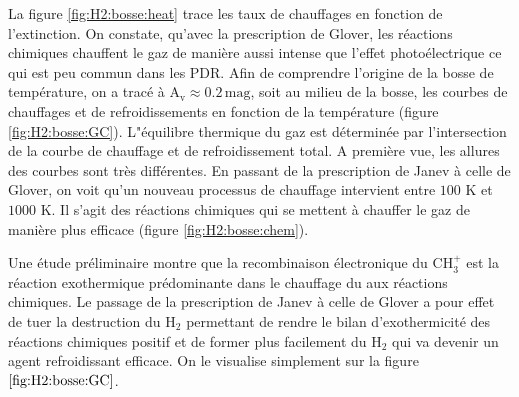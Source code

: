 La figure \ref{fig:H2:bosse:heat} trace les taux de chauffages en fonction de l'extinction. On constate, qu'avec la prescription de Glover, les réactions chimiques chauffent le gaz de manière aussi intense que l'effet photoélectrique ce qui est peu commun dans les PDR. Afin de comprendre l'origine de la bosse de température, on a tracé à $\mathrm{A}_\mathrm{v} \approx 0.2 \,\mathrm{mag}$, soit au milieu de la bosse, les courbes de chauffages et de refroidissements en fonction de la température (figure \ref{fig:H2:bosse:GC}). L"équilibre thermique du gaz est déterminée par l'intersection de la courbe de chauffage et de refroidissement total. A première vue, les allures des courbes sont très différentes. En passant de la prescription de Janev à celle de Glover, on voit qu'un nouveau processus de chauffage intervient entre $100$ K et $1000$ K. Il s'agit des réactions chimiques qui se mettent à chauffer le gaz de manière plus efficace (figure \ref{fig:H2:bosse:chem}). \newline

Une étude préliminaire montre que la recombinaison électronique du $\mathrm{CH}_3^+$ est la réaction exothermique prédominante dans le chauffage du aux réactions chimiques. Le passage de la prescription de Janev à celle de Glover a pour effet de tuer la destruction du $\mathrm{H}_2$ permettant de rendre le bilan d'exothermicité des réactions chimiques positif et de former plus facilement du $\mathrm{H}_2$ qui va devenir un agent refroidissant efficace. On le visualise simplement sur la figure $\ref{fig:H2:bosse:GC}$. \newline






